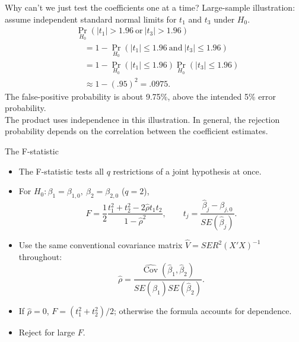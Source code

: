 \documentclass[notes,10pt, aspectratio=169]{beamer}
\begin{document}
\begin{frame}{Why can’t we just test the coefficients one at a time?}
Large-sample illustration: assume independent standard normal limits for $t_1$ and $t_3$ under $H_0$.
\begin{align*}
&\Pr_{H_0}(|t_1|>1.96\ \text{or}\ |t_3|>1.96)\\
&\quad=1-\Pr_{H_0}(|t_1|\leq1.96\ \text{and}\ |t_3|\leq1.96)\\
&\quad=1-\Pr_{H_0}(|t_1|\leq1.96)\Pr_{H_0}(|t_3|\leq1.96)\\
&\quad\approx1-(.95)^2=.0975.
\end{align*}
The false-positive probability is about 9.75\%, above the intended 5\% error probability.\\[1em]
The product uses independence in this illustration. In general, the rejection probability depends on the correlation between the coefficient estimates.
\end{frame}

\begin{frame}{The F-statistic}
\begin{itemize}
\item The F-statistic tests all $q$ restrictions of a joint hypothesis at once.
\item For $H_0:\beta_1=\beta_{1,0},\ \beta_2=\beta_{2,0}$ ($q=2$),
\[F=\frac12\frac{t_1^2+t_2^2-2\hat\rho t_1t_2}{1-\hat\rho^2},\qquad
 t_j=\frac{\hat\beta_j-\beta_{j,0}}{SE(\hat\beta_j)}.\]
\item Use the same conventional covariance matrix $\widehat V=SER^2(X'X)^{-1}$ throughout:
\[\hat\rho=\frac{\widehat{\operatorname{Cov}}(\hat\beta_1,\hat\beta_2)}{SE(\hat\beta_1)SE(\hat\beta_2)}.\]
\item If $\hat\rho=0$, $F=(t_1^2+t_2^2)/2$; otherwise the formula accounts for dependence.
\item Reject for large $F$.
\end{itemize}
\end{frame}
\end{document}
